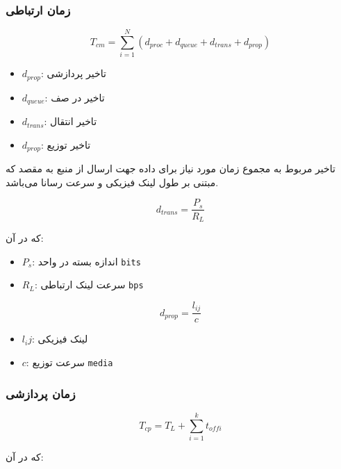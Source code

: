 \documentclass[a4paper]{article}
\begin{document}
\subsubsection{زمان ارتباطی}

\begin{equation}
    T_{cm} = \sum_{i=1}^{N} (d_{proc} + d_{queue} + d_{trans} + d_{prop})
\end{equation}

\begin{itemize}
    \item $d_{prop}$: تاخیر پردازشی
    \item $d_{queue}$: تاخیر در صف
    \item $d_{trans}$: تاخیر انتقال
    \item $d_{prop}$: تاخیر توزیع
\end{itemize}

تاخیر مربوط به  مجموع زمان مورد نیاز برای داده جهت ارسال از منبع
به مقصد که مبتنی بر طول لینک فیزیکی و سرعت رسانا می‌باشد.

\begin{equation}
    d_{trans} = \frac{P_s}{R_L}
\end{equation}

که در آن:

\begin{itemize}
    \item $P_s$: اندازه بسته در واحد \texttt{bits}
    \item $R_L$: سرعت لینک ارتباطی \texttt{bps}
\end{itemize}

\begin{equation}
    d_{prop} = \frac{l_{ij}}{c}
\end{equation}

\begin{itemize}
    \item $l_ij$: لینک فیزیکی
    \item $c$: سرعت توزیع \texttt{media}
\end{itemize}

\subsubsection{زمان پردازشی}

\begin{equation}
    T_{cp} = T_L + \sum_{i=1}^{k} t_{offi}
\end{equation}

که در آن:
\end{document}
